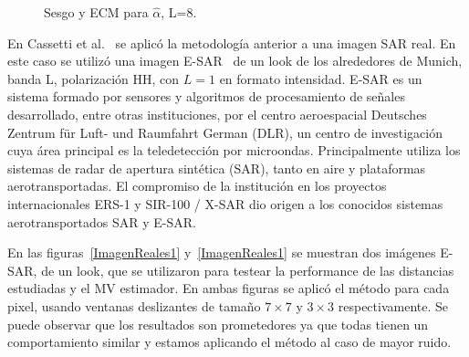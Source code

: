 \begin{figure}[h!]
	\centering
	\caption{\small Sesgo y ECM para $\widehat{\alpha}$, L=8.}
\end{figure}

En Cassetti et al.~\cite{APSAR2013ParameterEstimationStochasticDistances} se aplicó la metodología anterior a una imagen SAR real. En este caso se utilizó una imagen E-SAR~\cite{Horn1996} de un look de los alrededores de Munich, banda L, polarización HH, con $L=1$ en formato intensidad.
E-SAR es un sistema formado por sensores y algoritmos de procesamiento de señales desarrollado, entre otras instituciones, por el centro aeroespacial Deutsches Zentrum für Luft- und Raumfahrt German (DLR), un centro de investigación cuya área principal es la teledetección por microondas.  Principalmente utiliza los sistemas de radar de apertura sintética (SAR), tanto en aire y plataformas aerotransportadas. El compromiso de la institución en los proyectos internacionales ERS-1 y SIR-100 / X-SAR dio origen a los conocidos sistemas aerotransportados SAR y E-SAR. 

En las figuras~\ref{ImagenReales1} y~\ref{ImagenReales1} se muestran dos imágenes E-SAR, de un look, que se utilizaron para testear la performance de las distancias estudiadas y el MV estimador. En ambas figuras se aplicó el método para cada pixel, usando ventanas deslizantes de tamaño $7 \times 7$ y $3 \times 3$ respectivamente. Se puede observar que los resultados son prometedores ya que todas tienen un comportamiento similar y estamos aplicando el método al caso de mayor ruido.


